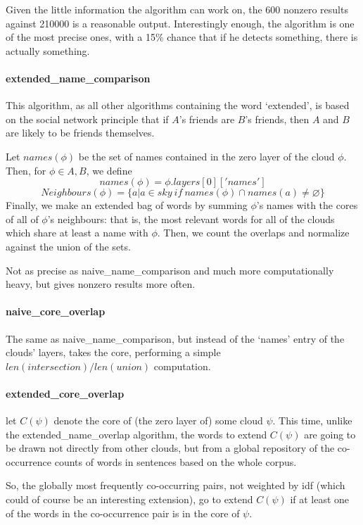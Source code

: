 \documentclass[11pt]{article}
\begin{document}
Given the little information the algorithm can work on, the 600 nonzero results against 210000 is a reasonable output. Interestingly enough, the algorithm is one of the most precise ones, with a 15\% chance that if he detects something, there is actually something.

\paragraph{extended\_name\_comparison}

This algorithm, as all other algorithms containing the word `extended', is based on the social network principle that if $A$'s friends are $B$'s friends, then $A$ and $B$ are likely to be friends themselves.

Let $names(\phi)$ be the set of names contained in the zero layer of the cloud $\phi$.
Then, for $\phi \in A,B$, we define
\[names(\phi) = \phi.layers[0]['names']\]
\[Neighbours(\phi) = \{a | a \in sky ~ if ~ names(\phi) \cap names(a) \neq \varnothing \}\]
Finally, we make an extended bag of words by summing $\phi$'s names with the cores of all of $\phi$'s neighbours: that is, the most relevant words for all of the clouds which share at least a name with $\phi$. Then, we count the overlaps and normalize against the union of the sets.

Not as precise as naive\_name\_comparison and much more computationally heavy, but gives nonzero results more often.

\paragraph{naive\_core\_overlap}

The same as naive\_name\_comparison, but instead of the `names' entry of the clouds' layers, takes the core, performing a simple \(len(intersection) / len(union)\) computation.

\paragraph{extended\_core\_overlap}

let $C(\psi)$ denote the core of (the zero layer of) some cloud $\psi$. This time, unlike the extended\_name\_overlap algorithm, the words to extend $C(\psi)$ are going to be drawn not directly from other clouds, but from a global repository of the co-occurrence counts of words in sentences based on the whole corpus.

So, the globally most frequently co-occurring pairs, not weighted by idf (which could of course be an interesting extension), go to extend $C(\psi)$ if at least one of the words in the co-occurrence pair is in the core of $\psi$.
\end{document}
